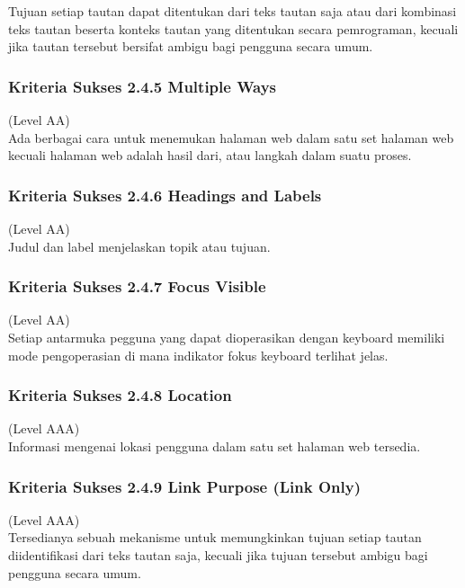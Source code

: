 Tujuan setiap tautan dapat ditentukan dari teks tautan saja atau dari kombinasi teks tautan beserta konteks tautan yang ditentukan secara pemrograman, kecuali jika tautan tersebut bersifat ambigu bagi pengguna secara umum.

\subsubsection{Kriteria Sukses 2.4.5 Multiple Ways}
\label{sec:kriteria_2.4.5}
(Level AA) \\

Ada berbagai cara untuk menemukan halaman web dalam satu set halaman web kecuali halaman web adalah hasil dari, atau langkah dalam suatu proses.

\subsubsection{Kriteria Sukses 2.4.6 Headings and Labels}
\label{sec:kriteria_2.4.6}
(Level AA) \\

Judul dan label menjelaskan topik atau tujuan.

\subsubsection{Kriteria Sukses 2.4.7 Focus Visible}
\label{sec:kriteria_2.4.7}
(Level AA) \\

Setiap antarmuka pegguna yang dapat dioperasikan dengan keyboard memiliki mode pengoperasian di mana indikator fokus keyboard terlihat jelas.

\subsubsection{Kriteria Sukses 2.4.8 Location}
\label{sec:kriteria_2.4.8}
(Level AAA) \\

Informasi mengenai lokasi pengguna dalam satu set halaman web tersedia.

\subsubsection{Kriteria Sukses 2.4.9 Link Purpose (Link Only)}
\label{sec:kriteria_2.4.9}
(Level AAA) \\

Tersedianya sebuah mekanisme untuk memungkinkan tujuan setiap tautan diidentifikasi dari teks tautan saja, kecuali jika tujuan tersebut ambigu bagi pengguna secara umum.

